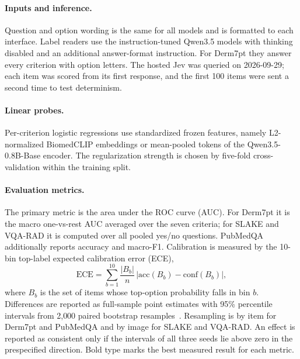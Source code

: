 \documentclass{article}
\begin{document}
\paragraph{Inputs and inference.} Question and option wording is the same for all models and is formatted to each interface. Label readers use the instruction-tuned Qwen3.5 models with thinking disabled and an additional answer-format instruction. For Derm7pt they answer every criterion with option letters. The hosted Jev was queried on 2026-09-29; each item was scored from its first response, and the first 100 items were sent a second time to test determinism.

\paragraph{Linear probes.} Per-criterion logistic regressions use standardized frozen features, namely L2-normalized BiomedCLIP embeddings or mean-pooled tokens of the Qwen3.5-0.8B-Base encoder. The regularization strength is chosen by five-fold cross-validation within the training split.

\paragraph{Evaluation metrics.} The primary metric is the area under the ROC curve (AUC). For Derm7pt it is the macro one-vs-rest AUC averaged over the seven criteria; for SLAKE and VQA-RAD it is computed over all pooled yes/no questions. PubMedQA additionally reports accuracy and macro-F1. Calibration is measured by the 10-bin top-label expected calibration error (ECE),
\begin{equation}
  \mathrm{ECE} = \sum_{b=1}^{10} \frac{|B_b|}{n}\,\big|\mathrm{acc}(B_b) - \mathrm{conf}(B_b)\big|,
  \label{eq:ece}
\end{equation}
where $B_b$ is the set of items whose top-option probability falls in bin $b$. Differences are reported as full-sample point estimates with 95\% percentile intervals from 2{,}000 paired bootstrap resamples~\citep{efron1994bootstrap}. Resampling is by item for Derm7pt and PubMedQA and by image for SLAKE and VQA-RAD. An effect is reported as consistent only if the intervals of all three seeds lie above zero in the prespecified direction. Bold type marks the best measured result for each metric.
\end{document}
